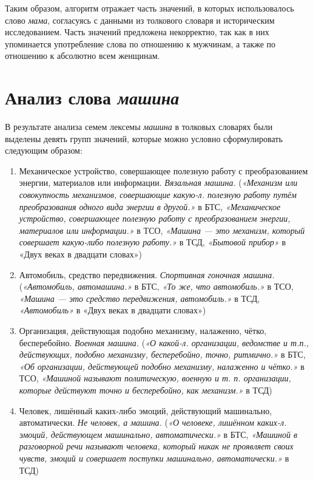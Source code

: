 Таким образом, алгоритм отражает часть значений, в которых использовалось
слово \textit{мама}, согласуясь с данными из толкового словаря и историческим исследованием.
Часть значений предложена некорректно, так как в них упоминается употребление слова по отношению
к мужчинам, а также по отношению к абсолютно всем женщинам.

\section*{Анализ слова \textit{машина}}

В результате анализа семем лексемы \textit{машина} в толковых словарях были выделены девять групп значений,
которые можно условно сформулировать следующим образом:

\begin{enumerate}
    \item Механическое устройство, совершающее полезную работу с преобразованием энергии, материалов или информации. \textit{Вязальная машина.}
(\textit{«Механизм или совокупность механизмов, совершающие какую-л. полезную работу путём преобразования одного вида энергии в другой.»} в БТС,
\textit{«Механическое устройство, совершающее полезную работу с преобразованием энергии, материалов или информации.»} в ТСО,
\textit{«Машина — это механизм, который совершает какую-либо полезную работу.»} в ТСД,
\textit{«Бытовой прибор»} в «Двух веках в двадцати словах»)

    \item Автомобиль, средство передвижения. \textit{Спортивная гоночная машина.}
(\textit{«Автомобиль, автомашина.»} в БТС,
\textit{«То же, что автомобиль.»} в ТСО,
\textit{«Машина — это средство передвижения, автомобиль.»} в ТСД,
\textit{«Автомобиль»} в «Двух веках в двадцати словах»)

    \item Организация, действующая подобно механизму, налаженно, чётко, бесперебойно. \textit{Военная машина.}
(\textit{«О какой-л. организации, ведомстве и т.п., действующих, подобно механизму, бесперебойно, точно, ритмично.»} в БТС,
\textit{«Об организации, действующей подобно механизму, налаженно и чётко.»} в ТСО,
\textit{«Машиной называют политическую, военную и т. п. организации, которые действуют точно и бесперебойно, как механизм.»} в ТСД)

    \item Человек, лишённый каких-либо эмоций, действующий машинально, автоматически. \textit{Не человек, а машина.}
(\textit{«О человеке, лишённом каких-л. эмоций, действующем машинально, автоматически.»} в БТС,
\textit{«Машиной в разговорной речи называют человека, который никак не проявляет своих чувств, эмоций и совершает поступки машинально, автоматически.»} в ТСД)


\end{enumerate}
